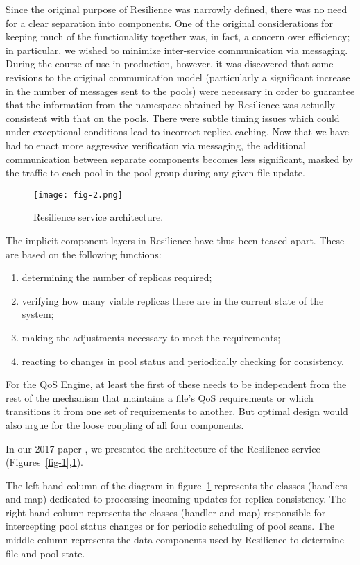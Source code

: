 \documentclass{webofc}
\begin{document}
Since the original  purpose of Resilience was  narrowly defined, there
was  no need  for  a  clear separation  into  components.  One of  the
original considerations for keeping much of the functionality together
was, in fact,  a concern over efficiency; in particular,  we wished to
minimize inter-service communication via messaging.  During the course
of use in  production, however, it was discovered  that some revisions
to  the  original  communication  model (particularly a significant increase 
in the  number  of messages sent to the pools) were  necessary in order 
to guarantee that the information from the namespace obtained by Resilience 
was actually consistent with  that on the  pools.  There were subtle  
timing issues which  could under  exceptional conditions  lead to incorrect 
replica caching.  Now that  we have had to enact  more aggressive verification
via   messaging,  the   additional   communication  between   separate
components becomes  less significant,  masked by  the traffic  to each
pool in the pool group during any given file update.
\begin{figure}[h]
\centering
\texttt{[image: fig-2.png]}
\caption{Resilience service architecture.}
\label{fig-2} 
\end{figure}
The  implicit component  layers in  Resilience have  thus been  teased
apart.  These are based on the following functions:
\begin{enumerate}
\item  determining the number of replicas required;
\item  verifying how many viable replicas there are in the current state of the system;
\item making the adjustments necessary to meet the requirements;
\item reacting to changes in pool status and periodically checking for consistency.
\end{enumerate}

For the QoS Engine, at least the first of these needs to be independent from the rest of the mechanism that maintains a file’s QoS requirements or which transitions it from one set of requirements to another.  But optimal design would also argue for the loose coupling of all four components.

In our 2017 paper \cite{Rossi:2017hxn}, we presented the architecture of the Resilience service (Figures~\ref{fig-1},\ref{fig-2}).


The left-hand column of the diagram in figure~\ref{fig-2} represents the classes (handlers and map) dedicated to processing incoming updates for replica consistency.  The right-hand column represents the classes (handler and map) responsible for intercepting pool status changes or for periodic scheduling of pool scans.  The middle column represents the data components used by Resilience to determine file and pool state.   
\end{document}
